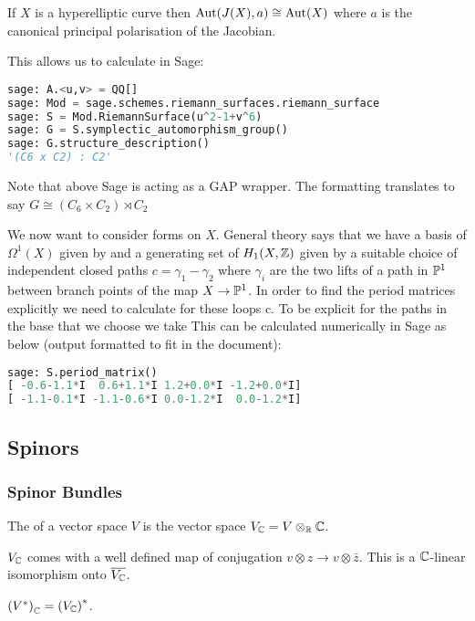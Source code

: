 \documentclass{article}
\begin{document}
\begin{lemma}
	If $X$ is a hyperelliptic curve then $\operatorname{Aut}(J(X),a) \cong \operatorname{Aut}(X)$ where $a$ is the canonical principal polarisation of the Jacobian. 
\end{lemma}
This allows us to calculate in Sage:
\begin{lstlisting}[language=Python,frame=single]
sage: A.<u,v> = QQ[]
sage: Mod = sage.schemes.riemann_surfaces.riemann_surface
sage: S = Mod.RiemannSurface(u^2-1+v^6)
sage: G = S.symplectic_automorphism_group()
sage: G.structure_description()
'(C6 x C2) : C2'
\end{lstlisting}
\begin{remark}
	Note that above Sage is acting as a GAP wrapper. The formatting translates to say $G \cong (C_6 \times C_2) \rtimes C_2$
\end{remark}
We now want to consider forms on $X$. General theory says that we have a basis of $\Omega^1(X)$ given by 
and a generating set of $H_1(X,\mathbb{Z})$ given by a suitable choice of independent closed paths $c = \gamma_1 - \gamma_2$ where $\gamma_i$ are the two lifts of a path in $\mathbb{P}^1$ between branch points of the map $X \to \mathbb{P}^1$. In order to find the period matrices explicitly we need to calculate 
for these loops c. To be explicit for the paths in the base that we choose we take 
This can be calculated numerically in Sage as below (output formatted to fit in the document):
\begin{lstlisting}[language=Python,frame=single]
sage: S.period_matrix()
[ -0.6-1.1*I  0.6+1.1*I 1.2+0.0*I -1.2+0.0*I]
[ -1.1-0.1*I -1.1-0.6*I 0.0-1.2*I  0.0-1.2*I]
\end{lstlisting}
\subsection{Spinors}
\subsubsection{Spinor Bundles}
\begin{definition}
	The  of a vector space $V$ is the vector space $V_{\mathbb{C}} = V \otimes_{\mathbb{R}} \mathbb{C}$. 
\end{definition}
\begin{prop}
	$V_{\mathbb{C}}$ comes with a well defined map of conjugation $v \otimes z \to v \otimes \bar{z}$. This is a $\mathbb{C}$-linear isomorphism onto $\overline{V_{\mathbb{C}}}$. 
\end{prop}
\begin{lemma}
	$\left( V^\ast \right)_{\mathbb{C}} = \left( V_{\mathbb{C}} \right)^\ast$. 
\end{lemma}
\end{document}
